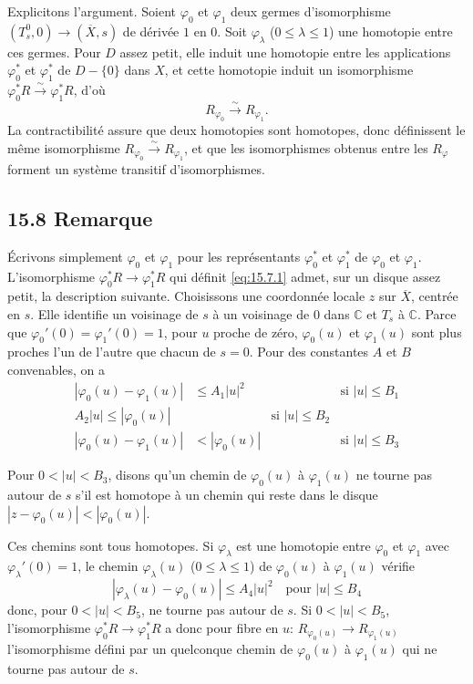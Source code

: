\documentclass[12pt,a4paper]{article}
\theoremstyle{plain}
\theoremstyle{definition}
\theoremstyle{remark}
\newcommand{\bC}{\mathbb{C}}
\begin{document}
Explicitons l'argument. Soient $\varphi_0$ et $\varphi_1$ deux germes d'isomorphisme $(T_s^0, 0) \to (\overline{X}, s)$ de dérivée $1$ en $0$. Soit $\varphi_\lambda$ ($0 \leqslant \lambda \leqslant 1$) une homotopie entre ces germes. Pour $D$ assez petit, elle induit une homotopie entre les applications $\varphi_0^*$ et $\varphi_1^*$ de $D - \{0\}$ dans $X$, et cette homotopie induit un isomorphisme $\varphi_0^* R \xrightarrow{\sim} \varphi_1^* R$, d'où
\begin{equation}\label{eq:15.7.1}
R_{\varphi_0} \xrightarrow{\sim} R_{\varphi_1}.
\end{equation}
La contractibilité assure que deux homotopies sont homotopes, donc définissent le même isomorphisme $R_{\varphi_0} \xrightarrow{\sim} R_{\varphi_1}$, et que les isomorphismes obtenus entre les $R_\varphi$ forment un système transitif d'isomorphismes.

\subsection*{15.8 Remarque}

Écrivons simplement $\varphi_0$ et $\varphi_1$ pour les représentants $\varphi_0^*$ et $\varphi_1^*$ de $\varphi_0$ et $\varphi_1$. L'isomorphisme $\varphi_0^* R \to \varphi_1^* R$ qui définit \eqref{eq:15.7.1} admet, sur un disque assez petit, la description suivante. Choisissons une coordonnée locale $z$ sur $\overline{X}$, centrée en $s$. Elle identifie un voisinage de $s$ à un voisinage de $0$ dans $\bC$ et $T_s$ à $\bC$. Parce que $\varphi_0'(0) = \varphi_1'(0) = 1$, pour $u$ proche de zéro, $\varphi_0(u)$ et $\varphi_1(u)$ sont plus proches l'un de l'autre que chacun de $s = 0$. Pour des constantes $A$ et $B$ convenables, on a
\begin{align}
|\varphi_0(u) - \varphi_1(u)| &\leqslant A_1 |u|^2 && \text{si } |u| \leqslant B_1 \label{eq:15.8.1}\\
A_2 |u| \leqslant |\varphi_0(u)| && \text{si } |u| \leqslant B_2 \label{eq:15.8.2}\\
|\varphi_0(u) - \varphi_1(u)| &< |\varphi_0(u)| && \text{si } |u| \leqslant B_3 \label{eq:15.8.3}
\end{align}

Pour $0 < |u| < B_3$, disons qu'un chemin de $\varphi_0(u)$ à $\varphi_1(u)$ ne tourne pas autour de $s$ s'il est homotope à un chemin qui reste dans le disque $|z - \varphi_0(u)| < |\varphi_0(u)|$.

Ces chemins sont tous homotopes. Si $\varphi_\lambda$ est une homotopie entre $\varphi_0$ et $\varphi_1$ avec $\varphi_\lambda'(0) = 1$, le chemin $\varphi_\lambda(u)$ ($0 \leqslant \lambda \leqslant 1$) de $\varphi_0(u)$ à $\varphi_1(u)$ vérifie
\[
|\varphi_\lambda(u) - \varphi_0(u)| \leqslant A_4 |u|^2 \quad \text{pour } |u| \leqslant B_4
\]
donc, pour $0 < |u| < B_5$, ne tourne pas autour de $s$. Si $0 < |u| < B_5$, l'isomorphisme $\varphi_0^* R \to \varphi_1^* R$ a donc pour fibre en $u$: $R_{\varphi_0(u)} \to R_{\varphi_1(u)}$ l'isomorphisme défini par un quelconque chemin de $\varphi_0(u)$ à $\varphi_1(u)$ qui ne tourne pas autour de $s$.
\end{document}
